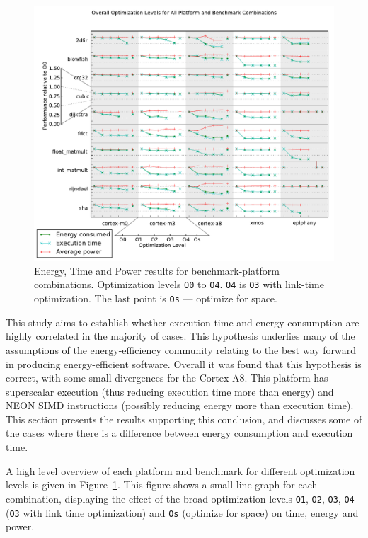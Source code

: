 \documentclass[twocolumn]{article}
\let\oldcaption\caption
\renewcommand{\caption}[1]{\oldcaption{\textup{#1}}}
\begin{document}
\begin{figure}[tb!]
	\centering
	\includegraphics[width=\textwidth,clip, trim=0cm 0cm 0 2.1cm]{levels.pdf}
	\caption{Energy, Time and Power results for benchmark-platform combinations. Optimization levels \texttt{O0} to \texttt{O4}. \texttt{O4} is \texttt{O3} with link-time optimization. The last point is \texttt{Os} --- optimize for space. }
	\label{Fig:OverallView}
\end{figure}
This study aims to establish whether execution time and energy consumption are highly correlated in the majority of cases. This hypothesis underlies many of the assumptions of the energy-efficiency community relating to the best way forward in producing energy-efficient software. Overall it was found that this hypothesis is correct, with some small divergences for the Cortex-A8. This platform has superscalar execution (thus reducing execution time more than energy) and NEON SIMD instructions (possibly reducing energy more than execution time). This section presents the results supporting this conclusion, and discusses some of the cases where there is a difference between energy consumption and execution time.

A high level overview of each platform and benchmark for different optimization levels is given in Figure~\ref{Fig:OverallView}. This figure shows a small line graph for each combination, displaying the effect of the broad optimization levels \texttt{O1}, \texttt{O2}, \texttt{O3}, \texttt{O4} (\texttt{O3} with link time optimization) and \texttt{Os} (optimize for space) on time, energy and power.
\end{document}
